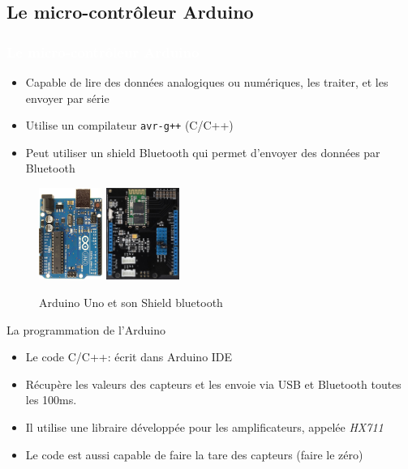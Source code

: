 \documentclass{beamer}
\begin{document}
\subsection{Le micro-contrôleur Arduino}
\begin{frame}
\frametitle{\textcolor{white}{Le micro-contrôleur Arduino}}
\begin{itemize}
\item Capable de lire des données analogiques ou numériques, les traiter, et les envoyer par série
\item Utilise un compilateur \texttt{avr-g++} (C/C++)
\item Peut utiliser un shield Bluetooth qui permet d'envoyer des données par Bluetooth
\end{itemize}
\begin{figure}
\begin{center}
\includegraphics[height=3cm]{images/uno.jpg}
\includegraphics[height=3cm]{images/BTshield.jpg}
\end{center}
\caption{Arduino Uno et son Shield bluetooth}
\label{fig:load_sensor_connected}
\end{figure}
\end{frame}

\begin{frame}
\begin{block}{La programmation de l'Arduino}
\begin{itemize}
\item Le code C/C++: écrit dans Arduino IDE
\item Récupère les valeurs des capteurs et les envoie via USB et Bluetooth toutes les 100ms.
\item Il utilise une libraire développée pour les amplificateurs, appelée \textit{HX711} \cite{hx711}
\item Le code est aussi capable de faire la tare des capteurs (faire le zéro)
\end{itemize}

\end{block}
\end{frame}
\end{document}
